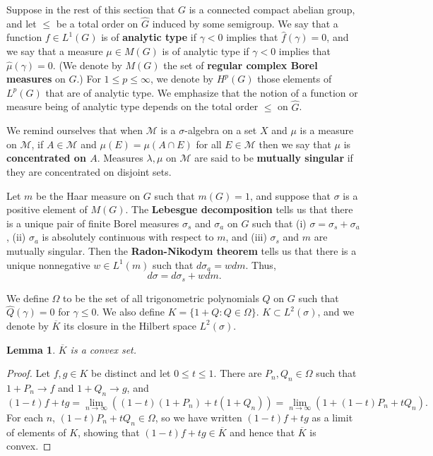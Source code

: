 \documentclass{article}
\newtheorem{lemma}[theorem]{Lemma}
\begin{document}
Suppose in the rest of this section that $G$ is a connected compact abelian group, and let $\leq$ be a total order on $\widehat{G}$ induced by some
semigroup. We say that a function $f \in L^1(G)$ is of \textbf{analytic type} if $\gamma<0$ implies that $\hat{f}(\gamma)=0$, and
we say that a  measure $\mu \in M(G)$ is of analytic type if $\gamma<0$ implies that $\hat{\mu}(\gamma)=0$. (We denote
by $M(G)$ the set of \textbf{regular complex Borel measures} on $G$.)
For $1 \leq p \leq \infty$, we denote by $H^p(G)$ those elements of $L^p(G)$ that are of analytic type.
We emphasize  that the notion of a function
or measure being of analytic type depends on the total order $\leq$ on $\widehat{G}$. 

We remind ourselves that when $\mathscr{M}$ is a $\sigma$-algebra on a set $X$ and $\mu$ is a measure on $\mathscr{M}$, if
$A \in \mathscr{M}$ and $\mu(E) = \mu(A \cap E)$ for all $E \in \mathscr{M}$ then we say that $\mu$ is \textbf{concentrated on $A$}.
Measures $\lambda,\mu$ on $\mathscr{M}$ are said to be \textbf{mutually singular} if they are concentrated on disjoint sets.

Let $m$ be the Haar measure on $G$ such that $m(G)=1$, and
suppose that $\sigma$ is a positive element of $M(G)$. The \textbf{Lebesgue decomposition} tells us that there is  a unique pair
of finite Borel measures $\sigma_s$ and $\sigma_a$ on $G$ such that (i) $\sigma=\sigma_s+\sigma_a$, (ii) $\sigma_a$ is absolutely continuous with respect
to $m$, and (iii) $\sigma_s$ and $m$ are mutually singular. Then the \textbf{Radon-Nikodym theorem} tells us that there is a unique nonnegative $w \in L^1(m)$
such that $d\sigma_a = w dm$. Thus, 
\[
d\sigma = d\sigma_s + w dm.
\]

We define $\Omega$ to be the set of all trigonometric polynomials $Q$ on $G$ such that $\hat{Q}(\gamma)=0$ for $\gamma \leq 0$.
We also define $K=\{1+Q: Q \in \Omega\}$. $K \subset L^2(\sigma)$, and we denote by $\overline{K}$ its closure in the Hilbert space
$L^2(\sigma)$. 

\begin{lemma}
$\overline{K}$ is a convex set.
\end{lemma}
\begin{proof}
Let $f,g \in K$ be distinct and let $0 \leq t \leq 1$. There are $P_n,Q_n \in \Omega$ such that
$1+P_n \to f$ and $1+Q_n \to g$, and 
\[
(1-t)f+tg = \lim_{n \to \infty} ((1-t)(1+P_n)+t(1+Q_n)) = 
\lim_{n \to \infty} (1+(1-t)P_n+tQ_n).
\]
For each $n$, $(1-t)P_n + tQ_n \in \Omega$, so we have written $(1-t)f+tg$ as a limit of elements of $K$, showing that
$(1-t)f+tg \in \overline{K}$ and hence that $\overline{K}$ is convex.
\end{proof}
\end{document}
